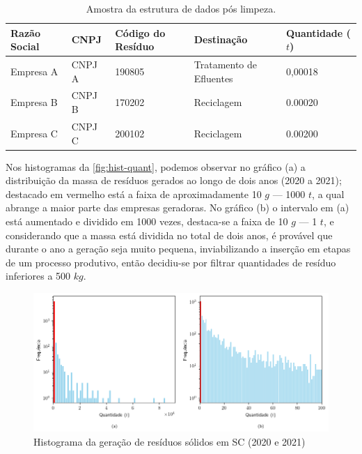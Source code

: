 \setcounter{table}{0}

\begin{table}[htb]
    \ABNTEXfontereduzida
    \centering
    \caption{Amostra da estrutura de dados pós limpeza. \label{tab:Tab_demo1}}
    \begin{tabular}{@{}lllll@{}}
        \toprule
        \textbf{Razão Social} & \textbf{CNPJ} & \textbf{Código do Resíduo} & \textbf{Destinação} & \textbf{Quantidade (\ensuremath{t})} \\ \midrule
        Empresa A & CNPJ A & 190805 & Tratamento de Efluentes & 0,00018 \\
        Empresa B & CNPJ B & 170202 & Reciclagem              & 0.00020 \\
        Empresa C & CNPJ C & 200102 & Reciclagem              & 0.00200 \\ \bottomrule
        \end{tabular}
\end{table}

Nos histogramas da \autoref{fig:hist-quant}, podemos observar no gráfico (a) a distribuição da massa de resíduos gerados ao longo de dois anos (2020 a 2021); destacado em vermelho está a faixa de aproximadamente 10 \ensuremath{g} — 1000 \ensuremath{t}, a qual abrange a maior parte das empresas geradoras.
No gráfico (b) o intervalo em (a) está aumentado e dividido em 1000 vezes, destaca-se a faixa de 10 \ensuremath{g} — 1 \ensuremath{t}, e considerando que a massa está dividida no total de dois anos, é provável que durante o ano a geração seja muito pequena, inviabilizando a inserção em etapas de um processo produtivo, então decidiu-se por filtrar quantidades de resíduo inferiores a 500 \ensuremath{kg}.

\begin{figure}[htb]
	\caption{\label{fig:hist-quant} Histograma da geração de resíduos sólidos em SC (2020 e 2021)}
	\begin{center}
		\includegraphics[scale=0.75]{images/hist-quantidade.png}
	\end{center}
\end{figure}

